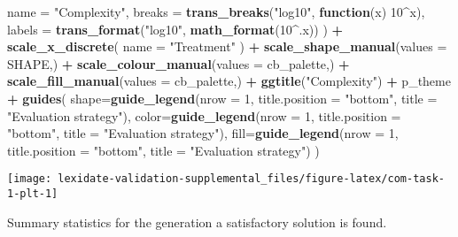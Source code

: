 \documentclass[
]{book}
\newenvironment{Shaded}{\begin{snugshade}}{\end{snugshade}}
\newcommand{\AttributeTok}[1]{\textcolor[rgb]{0.13,0.29,0.53}{#1}}
\newcommand{\ControlFlowTok}[1]{\textcolor[rgb]{0.13,0.29,0.53}{\textbf{#1}}}
\newcommand{\DecValTok}[1]{\textcolor[rgb]{0.00,0.00,0.81}{#1}}
\newcommand{\FunctionTok}[1]{\textcolor[rgb]{0.13,0.29,0.53}{\textbf{#1}}}
\newcommand{\NormalTok}[1]{#1}
\newcommand{\SpecialCharTok}[1]{\textcolor[rgb]{0.81,0.36,0.00}{\textbf{#1}}}
\newcommand{\StringTok}[1]{\textcolor[rgb]{0.31,0.60,0.02}{#1}}
\begin{document}
\begin{Shaded}
\begin{Highlighting}[]
    \AttributeTok{name =} \StringTok{"Complexity"}\NormalTok{,}
    \AttributeTok{breaks =} \FunctionTok{trans\_breaks}\NormalTok{(}\StringTok{"log10"}\NormalTok{, }\ControlFlowTok{function}\NormalTok{(x) }\DecValTok{10}\SpecialCharTok{\^{}}\NormalTok{x),}
    \AttributeTok{labels =} \FunctionTok{trans\_format}\NormalTok{(}\StringTok{"log10"}\NormalTok{, }\FunctionTok{math\_format}\NormalTok{(}\DecValTok{10}\SpecialCharTok{\^{}}\NormalTok{.x))}
\NormalTok{  ) }\SpecialCharTok{+}
  \FunctionTok{scale\_x\_discrete}\NormalTok{(}
    \AttributeTok{name =} \StringTok{"Treatment"}
\NormalTok{  ) }\SpecialCharTok{+}
  \FunctionTok{scale\_shape\_manual}\NormalTok{(}\AttributeTok{values =}\NormalTok{ SHAPE,) }\SpecialCharTok{+}
  \FunctionTok{scale\_colour\_manual}\NormalTok{(}\AttributeTok{values =}\NormalTok{ cb\_palette,) }\SpecialCharTok{+}
  \FunctionTok{scale\_fill\_manual}\NormalTok{(}\AttributeTok{values =}\NormalTok{ cb\_palette,) }\SpecialCharTok{+}
  \FunctionTok{ggtitle}\NormalTok{(}\StringTok{"Complexity"}\NormalTok{) }\SpecialCharTok{+}
\NormalTok{  p\_theme }\SpecialCharTok{+}
  \FunctionTok{guides}\NormalTok{(}
    \AttributeTok{shape=}\FunctionTok{guide\_legend}\NormalTok{(}\AttributeTok{nrow =} \DecValTok{1}\NormalTok{, }\AttributeTok{title.position =} \StringTok{"bottom"}\NormalTok{,}
                       \AttributeTok{title =} \StringTok{"Evaluation strategy"}\NormalTok{),}
    \AttributeTok{color=}\FunctionTok{guide\_legend}\NormalTok{(}\AttributeTok{nrow =} \DecValTok{1}\NormalTok{, }\AttributeTok{title.position =} \StringTok{"bottom"}\NormalTok{,}
                       \AttributeTok{title =} \StringTok{"Evaluation strategy"}\NormalTok{),}
    \AttributeTok{fill=}\FunctionTok{guide\_legend}\NormalTok{(}\AttributeTok{nrow =} \DecValTok{1}\NormalTok{, }\AttributeTok{title.position =} \StringTok{"bottom"}\NormalTok{,}
                      \AttributeTok{title =} \StringTok{"Evaluation strategy"}\NormalTok{)}
\NormalTok{  )}
\end{Highlighting}
\end{Shaded}

\texttt{[image: lexidate-validation-supplemental\_files/figure-latex/com-task-1-plt-1]}

Summary statistics for the generation a satisfactory solution is found.
\end{document}
